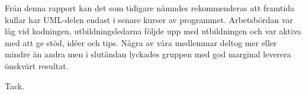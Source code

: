 \documentclass{article}
\theoremstyle{remark}                                         %
\newcommand{\kommentar}[1]{\todo{#1}}
\begin{document}

Från denna rapport kan det som tidigare nämndes rekommenderas att framtida kullar har UML-delen endast i senare kurser av programmet. Arbetsbördan var låg vid kodningen, utbildningsledarna följde upp med utbildningen och var aktiva med att ge stöd, idéer och tips. Några av våra medlemmar deltog mer eller mindre än andra men i slutändan lyckades gruppen med god marginal leverera önskvärt resultat. 

Tack. 
\vspace*{1cm \hfill /H}

\clearpage


\printindex
\end{document}
